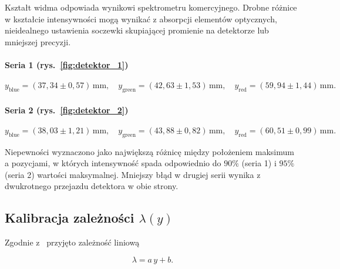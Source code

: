 \documentclass[12pt]{article}
\begin{document}
Kształt widma odpowiada wynikowi spektrometru komercyjnego. Drobne różnice w kształcie intensywności mogą wynikać z absorpcji elementów optycznych, nieidealnego ustawienia soczewki skupiającej promienie na detektorze lub mniejszej precyzji.

\paragraph{Seria 1 (rys.~\ref{fig:detektor_1})}
\[
  y_{\mathrm{blue}}  = (37{,}34 \pm 0{,}57)\,\mathrm{mm}, \quad
  y_{\mathrm{green}} = (42{,}63 \pm 1{,}53)\,\mathrm{mm}, \quad
  y_{\mathrm{red}}   = (59{,}94 \pm 1{,}44)\,\mathrm{mm}.
\]

\paragraph{Seria 2 (rys.~\ref{fig:detektor_2})}
\[
  y_{\mathrm{blue}}  = (38{,}03 \pm 1{,}21)\,\mathrm{mm}, \quad
  y_{\mathrm{green}} = (43{,}88 \pm 0{,}82)\,\mathrm{mm}, \quad
  y_{\mathrm{red}}   = (60{,}51 \pm 0{,}99)\,\mathrm{mm}.
\]

Niepewności wyznaczono jako największą różnicę między położeniem maksimum a pozycjami, w których intensywność spada odpowiednio do \(90\%\) (seria 1) i \(95\%\) (seria 2) wartości maksymalnej. Mniejszy błąd w drugiej serii wynika z dwukrotnego przejazdu detektora w obie strony.

\subsection*{Kalibracja zależności \(\lambda(y)\)}

Zgodnie z~\cite{skrypt} przyjęto zależność liniową  

\[
  \lambda = a\,y + b.
\]
\end{document}
